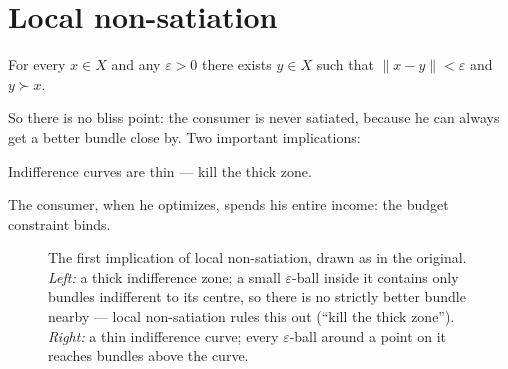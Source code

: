 \documentclass[11pt]{article}
\begin{document}
\section{Local non-satiation}

 For every $x\in X$ and any $\varepsilon>0$ there
exists $y\in X$ such that $\lVert x-y\rVert<\varepsilon$ and $y\succ x$.

So there is no bliss point: the consumer is never satiated, because he can always
get a better bundle close by. Two important implications:

\begin{flatlist}
  \item Indifference curves are thin --- kill the thick zone.

  \item The consumer, when he optimizes, spends his entire income: the budget
        constraint binds.
\end{flatlist}

\begin{figure}[ht]
\centering
{}
\caption{The first implication of local non-satiation, drawn as in the original.
\emph{Left:} a thick indifference zone; a small $\varepsilon$-ball inside it
contains only bundles indifferent to its centre, so there is no strictly better
bundle nearby --- local non-satiation rules this out (``kill the thick zone'').
\emph{Right:} a thin indifference curve; every $\varepsilon$-ball around a point
on it reaches bundles above the curve.}
\end{figure}
\end{document}
